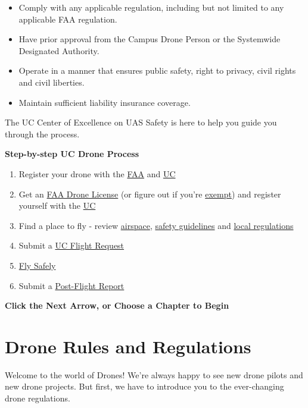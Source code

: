 \documentclass[
  12pt,
]{book}
\providecommand{\tightlist}{%
  \setlength{\itemsep}{0pt}\setlength{\parskip}{0pt}}
\begin{document}
\begin{itemize}
\tightlist
\item
  Comply with any applicable regulation, including but not limited to any applicable FAA regulation.
\item
  Have prior approval from the Campus Drone Person or the Systemwide Designated Authority.
\item
  Operate in a manner that ensures public safety, right to privacy, civil rights and civil liberties.
\item
  Maintain sufficient liability insurance coverage.
\end{itemize}

The UC Center of Excellence on UAS Safety is here to help you guide you through the process.

\textbf{Step-by-step UC Drone Process}

\begin{enumerate}
\def\labelenumi{\arabic{enumi}.}
\tightlist
\item
  Register your drone with the \protect\hyperlink{registration}{FAA} and \protect\hyperlink{UCDrones-drone}{UC}
\item
  Get an \protect\hyperlink{license}{FAA Drone License} (or figure out if you're \protect\hyperlink{difference}{exempt}) and register yourself with the \protect\hyperlink{UCDrones-pilot}{UC}
\item
  Find a place to fly - review \protect\hyperlink{airspace-info}{airspace}, \protect\hyperlink{safety}{safety guidelines} and \protect\hyperlink{local-regulations}{local regulations}
\item
  Submit a \protect\hyperlink{UCDrones-project}{UC Flight Request}
\item
  \protect\hyperlink{tips}{Fly Safely}
\item
  Submit a \protect\hyperlink{UCDrones-post}{Post-Flight Report}
\end{enumerate}

\textbf{Click the Next Arrow, or Choose a Chapter to Begin}

\hypertarget{regulations}{%
\chapter{Drone Rules and Regulations}\label{regulations}}

Welcome to the world of Drones! We're always happy to see new drone pilots and new drone projects. But first, we have to introduce you to the ever-changing drone regulations.
\end{document}
